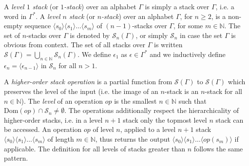 \documentclass[a4paper,UKenglish,cleveref, autoref, thm-restate]{lipics-v2021}
\newcommand{\N}{\mathbb{N}}
\begin{document}
A {\em level $1$ stack} (or {\em $1$-stack}) over an alphabet $\Gamma$ is 
simply a 
	stack over $\Gamma$, i.e. a word  in $\Gamma^*$.
A  {\em level $n$ stack} (or {\em $n$-stack}) over an alphabet $\Gamma$, for $n \geq 2$, is a 
non-empty sequence
$ \langle s_0 \rangle \langle s_1 \rangle \ldots \langle s_m \rangle$
of
$(n-1)$-stacks over $\Gamma$,
for some $m \in \N$.
The set of $n$-stacks over $\Gamma$ is denoted by $\mathscr{S}_n(\Gamma)$,
or simply $\mathscr{S}_n$ in case the set $\Gamma$ is obvious from context.
The set of all stacks over $\Gamma$ is written $\mathscr{S}(\Gamma) = \bigcup_{n\in \N} \mathscr{S}_n(\Gamma)$.
We define $\epsilon_{1}$ as
$\epsilon \in \Gamma^*$ and we inductively define 
$\epsilon_{n} = \langle \epsilon_{n-1} \rangle$ in $\mathscr{S}_n$ for all $n > 1$.




A {\em higher-order stack operation} is a partial function from $\mathscr{S}(\Gamma)$ 
to $\mathscr{S}(\Gamma)$ which preserves the level of the input (i.e. the image of
an $n$-stack is an $n$-stack for all $n \in \N$). The {\em level } of an operation $op$
is the smallest $n \in \N$ such that $\text{Dom}(op) \cap \mathscr{S}_n \neq \emptyset$. 
The operations 
additionally
 respect the hierarchicality of higher-order stacks, i.e. in
a level $n+1$ stack only the topmost level $n$ stack can be accessed. An operation
$op$ of level $n$, applied to a level $n+1$ stack 
$ \langle s_0 \rangle \langle s_1 \rangle \ldots \langle s_m \rangle$
of length $m \in \N$,
thus
returns the output
$ \langle s_0 \rangle \langle s_1 \rangle \ldots \langle op(s_m) \rangle$
if applicable.
The definition for  all levels of stacks greater than $n$ follows the same pattern.
\end{document}
